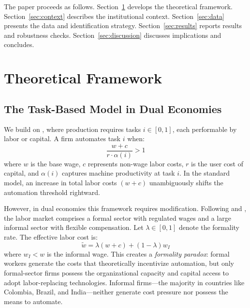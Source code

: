 \documentclass[a4paper,fleqn]{cas-sc}
\begin{document}
The paper proceeds as follows. Section~\ref{sec:theory} develops the theoretical framework. Section~\ref{sec:context} describes the institutional context. Section~\ref{sec:data} presents the data and identification strategy. Section~\ref{sec:results} reports results and robustness checks. Section~\ref{sec:discussion} discusses implications and concludes.

\FloatBarrier


\section{Theoretical Framework}
\label{sec:theory}

\subsection{The Task-Based Model in Dual Economies}
\label{subsec:task_model}

We build on \citet{acemoglu2019automation}, where production requires tasks $i \in [0,1]$, each performable by labor or capital. A firm automates task $i$ when:
\begin{equation}
\label{eq:automation_threshold}
\frac{w + c}{r \cdot \alpha(i)} > 1
\end{equation}
where $w$ is the base wage, $c$ represents non-wage labor costs, $r$ is the user cost of capital, and $\alpha(i)$ captures machine productivity at task $i$. In the standard model, an increase in total labor costs $(w + c)$ unambiguously shifts the automation threshold rightward.

However, in dual economies this framework requires modification. Following \citet{laporta2014} and \citet{ulyssea2018}, the labor market comprises a formal sector with regulated wages and a large informal sector with flexible compensation. Let $\lambda \in [0,1]$ denote the formality rate. The effective labor cost is:
\begin{equation}
\label{eq:effective_cost}
\tilde{w} = \lambda(w + c) + (1-\lambda) w_I
\end{equation}
where $w_I < w$ is the informal wage. This creates a \emph{formality paradox}: formal workers generate the costs that theoretically incentivize automation, but only formal-sector firms possess the organizational capacity and capital access to adopt labor-replacing technologies. Informal firms---the majority in countries like Colombia, Brazil, and India---neither generate cost pressure nor possess the means to automate.
\end{document}
